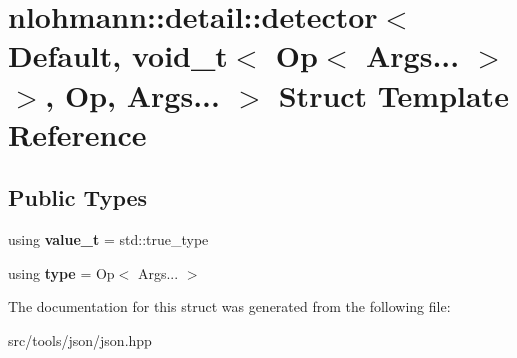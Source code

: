 \hypertarget{structnlohmann_1_1detail_1_1detector_3_01Default_00_01void__t_3_01Op_3_01Args_8_8_8_01_4_01_4_00_01Op_00_01Args_8_8_8_01_4}{}\section{nlohmann\+:\+:detail\+:\+:detector$<$ Default, void\+\_\+t$<$ Op$<$ Args... $>$ $>$, Op, Args... $>$ Struct Template Reference}
\label{structnlohmann_1_1detail_1_1detector_3_01Default_00_01void__t_3_01Op_3_01Args_8_8_8_01_4_01_4_00_01Op_00_01Args_8_8_8_01_4}
\subsection*{Public Types}
\begin{DoxyCompactItemize}
\item 
\mbox{\label{structnlohmann_1_1detail_1_1detector_3_01Default_00_01void__t_3_01Op_3_01Args_8_8_8_01_4_01_4_00_01Op_00_01Args_8_8_8_01_4_ab748f9f00bb31bee4978a033589f8c85}} 
using {\bfseries value\+\_\+t} = std\+::true\+\_\+type
\item 
\mbox{\label{structnlohmann_1_1detail_1_1detector_3_01Default_00_01void__t_3_01Op_3_01Args_8_8_8_01_4_01_4_00_01Op_00_01Args_8_8_8_01_4_a5afd6a40e94dde21d120ac646468c495}} 
using {\bfseries type} = Op$<$ Args... $>$
\end{DoxyCompactItemize}


The documentation for this struct was generated from the following file\+:\begin{DoxyCompactItemize}
\item 
src/tools/json/json.\+hpp\end{DoxyCompactItemize}

